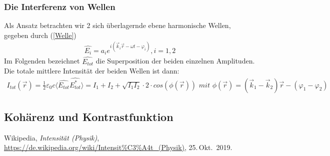 \documentclass[german,  %
parskip=full,  %
]{scrartcl}
\begin{document}
\subsubsection{Die Interferenz von Wellen}
Als Ansatz betrachten wir 2 sich überlagernde ebene harmonische Wellen, gegeben durch (\ref{Welle})
\begin{align}
\label{Welle} \hat{E_i}=a_i e^{i(\vec{k}_i \vec{r} - \omega t - \varphi_i)}, i=1,2
\end{align}
Im Folgenden bezeichnet $\hat{E_{tot}}$ die Superposition der beiden einzelnen Amplituden.
Die totale mittlere Intensität der beiden Wellen ist dann:
\begin{align}
\label{Intensität4} I_{tot}(\vec{r})=\frac{1}{2} \varepsilon_0 c \langle \hat{E_{tot}} \hat{{E_{tot}^*}} \rangle = 
I_1 + I_2 + \sqrt{I_1 I_2}\cdot2\cdot cos(\phi(\vec{r})) \,\,mit\,\, \phi(\vec{r}) = (\vec{k}_1 - \vec{k}_2) \vec{r} - (\varphi_1 - \varphi_2)
\end{align}

\subsection{Kohärenz und Kontrastfunktion}





    \begin{thebibliography}{9}
    Wikipedia,
    \emph{Intensität (Physik)},
    \url{https://de.wikipedia.org/wiki/Intensit%C3%A4t_(Physik)},
    25.\,Okt.~2019.
    \end{thebibliography}

\end{document}
